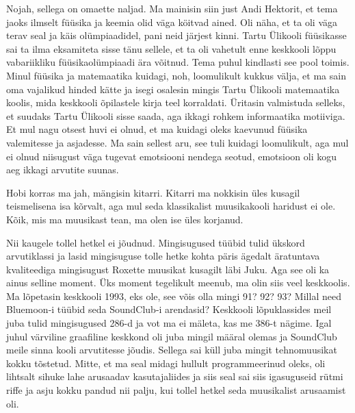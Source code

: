 
Nojah, sellega on omaette naljad. Ma mainisin siin just Andi Hektorit, et tema jaoks ilmselt  füüsika ja keemia olid väga köitvad ained. Oli näha, et ta oli väga terav seal ja käis olümpiaadidel, pani neid järjest kinni. Tartu Ülikooli füüsikasse sai ta ilma eksamiteta sisse tänu sellele, et ta oli vahetult enne keskkooli lõppu vabariikliku füüsikaolümpiaadi ära võitnud. Tema puhul kindlasti see pool toimis.  Minul füüsika ja matemaatika kuidagi, noh, loomulikult kukkus välja, et ma sain oma vajalikud hinded kätte ja isegi osalesin mingis Tartu Ülikooli matemaatika koolis, mida keskkooli õpilastele kirja teel  korraldati. Üritasin  valmistuda selleks, et suudaks  Tartu Ülikooli sisse saada, aga ikkagi rohkem informaatika motiiviga. Et mul nagu otsest huvi ei olnud, et ma kuidagi oleks kaevunud füüsika valemitesse ja asjadesse. Ma sain sellest aru, see tuli kuidagi loomulikult, aga mul ei olnud niisugust väga tugevat emotsiooni nendega seotud, emotsioon oli kogu aeg ikkagi arvutite suunas. 


Hobi korras ma jah, mängisin kitarri. Kitarri ma nokkisin üles kusagil teismelisena isa kõrvalt, aga  mul seda klassikalist muusikakooli haridust ei ole. Kõik, mis ma muusikast tean, ma olen ise üles korjanud. 


Nii kaugele tollel hetkel ei jõudnud. Mingisugused tüübid tulid ükskord  arvutiklassi ja lasid mingisuguse tolle hetke kohta päris ägedalt äratuntava kvaliteediga mingisugust Roxette muusikat kusagilt läbi Juku. Aga see oli ka ainus selline moment. Üks moment tegelikult meenub, ma olin siis veel keskkoolis. Ma lõpetasin keskkooli 1993, eks ole, see võis olla mingi 91? 92? 93? Millal need Bluemoon-i tüübid seda SoundClub-i arendasid? Keskkooli lõpuklassides meil juba tulid mingisugused 286-d ja vot ma ei mäleta, kas me 386-t nägime. Igal juhul värviline  graafiline keskkond oli juba mingil määral olemas ja SoundClub meile sinna kooli arvutitesse jõudis. Sellega sai küll juba mingit tehnomuusikat kokku tõstetud. Mitte, et ma seal midagi hullult programmeerinud oleks, oli lihtsalt sihuke lahe arusaadav kasutajaliides ja siis seal sai siis igasuguseid rütmi riffe ja asju kokku pandud  nii palju, kui tollel hetkel seda muusikalist arusaamist oli. 

